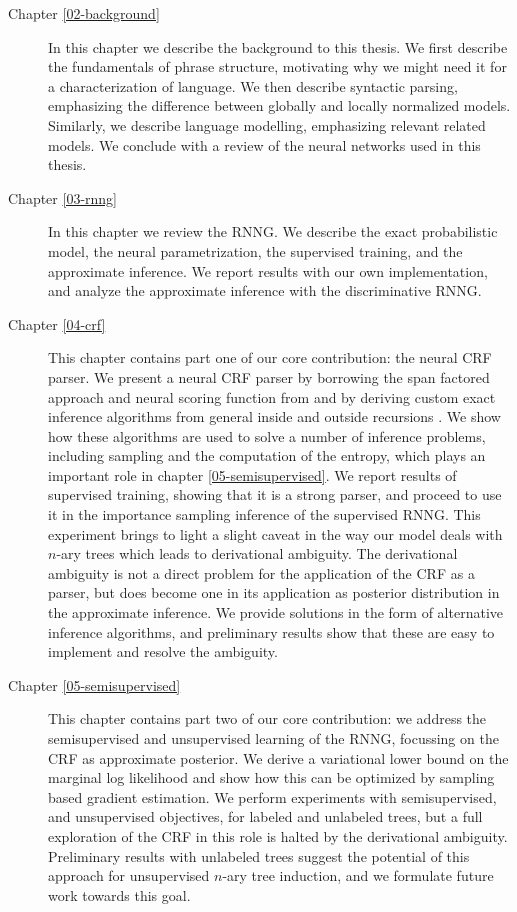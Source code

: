 \begin{description}
  \item[Chapter \ref{02-background}]
    In this chapter we describe the background to this thesis. We first describe the fundamentals of phrase structure, motivating why we might need it for a characterization of language. We then describe syntactic parsing, emphasizing the difference between globally and locally normalized models. Similarly, we describe language modelling, emphasizing relevant related models. We conclude with a review of the neural networks used in this thesis.

  \item[Chapter \ref{03-rnng}]
    In this chapter we review the RNNG. We describe the exact probabilistic model, the neural parametrization, the supervised training, and the approximate inference. We report results with our own implementation, and analyze the approximate inference with the discriminative RNNG.

  \item[Chapter \ref{04-crf}]
    This chapter contains part one of our core contribution: the neural CRF parser. We present a neural CRF parser by borrowing the span factored approach and neural scoring function from \citet{stern2017minimal} and by deriving custom exact inference algorithms from general inside and outside recursions \citep{goodman1999semiring}. We show how these algorithms are used to solve a number of inference problems, including sampling and the computation of the entropy, which plays an important role in chapter \ref{05-semisupervised}. We report results of supervised training, showing that it is a strong parser, and proceed to use it in the importance sampling inference of the supervised RNNG. This experiment brings to light a slight caveat in the way our model deals with $n$-ary trees which leads to derivational ambiguity. The derivational ambiguity is not a direct problem for the application of the CRF as a parser, but does become one in its application as posterior distribution in the approximate inference. We provide solutions in the form of alternative inference algorithms, and preliminary results show that these are easy to implement and resolve the ambiguity.

  \item[Chapter \ref{05-semisupervised}]
    This chapter contains part two of our core contribution: we address the semisupervised and unsupervised learning of the RNNG, focussing on the CRF as approximate posterior. We derive a variational lower bound on the marginal log likelihood and show how this can be optimized by sampling based gradient estimation. We perform experiments with semisupervised, and unsupervised objectives, for labeled and unlabeled trees, but a full exploration of the CRF in this role is halted by the derivational ambiguity. Preliminary results with unlabeled trees suggest the potential of this approach for unsupervised $n$-ary tree induction, and we formulate future work towards this goal.


\end{description}
